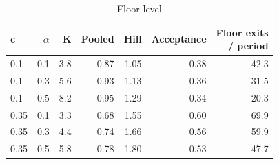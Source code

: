 \begin{table}[htbp]
\centering
\caption{Floor level}
\label{tab:a11a_floor}
\small
\begin{tabular}{lrrrrrr}
\toprule
c & $\alpha$ & K & Pooled & Hill & Acceptance & \makecell[b]{Floor exits\\{}/ period} \\
\midrule
0.1 & 0.1 & 3.8 & 0.87 & 1.05 & 0.38 & 42.3 \\
0.1 & 0.3 & 5.6 & 0.93 & 1.13 & 0.36 & 31.5 \\
0.1 & 0.5 & 8.2 & 0.95 & 1.29 & 0.34 & 20.3 \\
0.35 & 0.1 & 3.3 & 0.68 & 1.55 & 0.60 & 69.9 \\
0.35 & 0.3 & 4.4 & 0.74 & 1.66 & 0.56 & 59.9 \\
0.35 & 0.5 & 5.8 & 0.78 & 1.80 & 0.53 & 47.7 \\
\bottomrule
\end{tabular}
\end{table}
